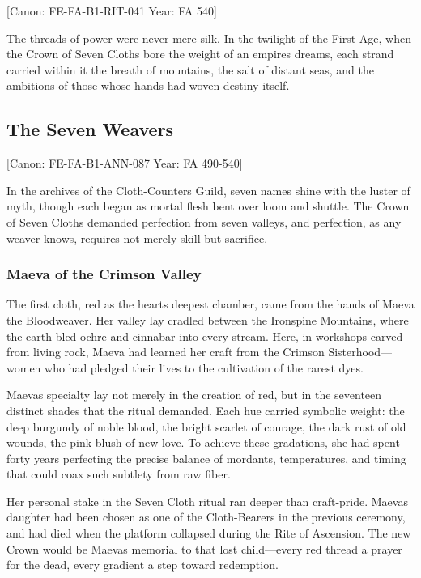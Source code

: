 {[}Canon: FE-FA-B1-RIT-041 \textbar{} Year: FA 540{]}

The threads of power were never mere silk. In the twilight of the First
Age, when the Crown of Seven Cloths bore the weight of an
empire\textquotesingle s dreams, each strand carried within it the
breath of mountains, the salt of distant seas, and the ambitions of
those whose hands had woven destiny itself.

\subsection{The Seven Weavers}\label{the-seven-weavers}

{[}Canon: FE-FA-B1-ANN-087 \textbar{} Year: FA 490-540{]}

In the archives of the Cloth-Counters\textquotesingle{} Guild, seven
names shine with the luster of myth, though each began as mortal flesh
bent over loom and shuttle. The Crown of Seven Cloths demanded
perfection from seven valleys, and perfection, as any weaver knows,
requires not merely skill but sacrifice.

\subsubsection{Maeva of the Crimson
Valley}\label{maeva-of-the-crimson-valley}

The first cloth, red as the heart\textquotesingle s deepest chamber,
came from the hands of Maeva the Bloodweaver. Her valley lay cradled
between the Ironspine Mountains, where the earth bled ochre and cinnabar
into every stream. Here, in workshops carved from living rock, Maeva had
learned her craft from the Crimson Sisterhood---women who had pledged
their lives to the cultivation of the rarest dyes.

Maeva\textquotesingle s specialty lay not merely in the creation of red,
but in the seventeen distinct shades that the ritual demanded. Each hue
carried symbolic weight: the deep burgundy of noble blood, the bright
scarlet of courage, the dark rust of old wounds, the pink blush of new
love. To achieve these gradations, she had spent forty years perfecting
the precise balance of mordants, temperatures, and timing that could
coax such subtlety from raw fiber.

Her personal stake in the Seven Cloth ritual ran deeper than
craft-pride. Maeva\textquotesingle s daughter had been chosen as one of
the Cloth-Bearers in the previous ceremony, and had died when the
platform collapsed during the Rite of Ascension. The new Crown would be
Maeva\textquotesingle s memorial to that lost child---every red thread a
prayer for the dead, every gradient a step toward redemption.

